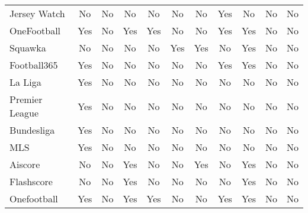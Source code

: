 \begin{table}[h!]
\begin{tabularx}{\textwidth}{|p{3cm}|c|c|c|c|c|c|c|c|c|c|}
    Jersey Watch & No & No & No & No & No & No & Yes & No & No & No \\
    OneFootball & Yes & No & Yes & Yes & No & No & Yes & Yes & No & No \\
    Squawka & No & No & No & No & Yes & Yes & No & Yes & No & No \\
    Football365 & Yes & No & No & No & No & No & Yes & Yes & No & No \\
    La Liga & Yes & No & No & No & No & No & No & No & No & No \\
    Premier League & Yes & No & No & No & No & No & No & No & No & No \\
    Bundesliga & Yes & No & No & No & No & No & No & No & No & No \\
    MLS & Yes & No & No & No & No & No & No & No & No & No \\
    Aiscore & No & No & Yes & No & No & Yes & No & Yes & No & No \\
    Flashscore & No & No & Yes & No & No & No & No & Yes & No & No \\
    Onefootball & Yes & No & Yes & Yes & No & No & Yes & Yes & No & No \\
    \hline
    \end{tabularx}
\end{table}
    



